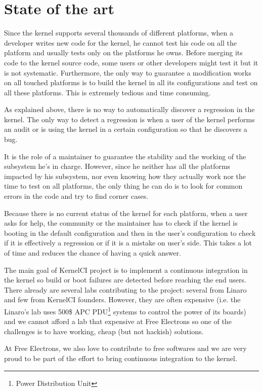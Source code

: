 \section{State of the art}
Since the kernel supports several thousands of different platforms, when a developer writes new code for the kernel, he cannot test his code on all the platform and usually tests only on the platforms he owns. Before merging its code to the kernel source code, some users or other developers might test it but it is not systematic. Furthermore, the only way to guarantee a modification works on all touched platforms is to build the kernel in all its configurations and test on all these platforms. This is extremely tedious and time consuming.

As explained above, there is no way to automatically discover a regression in the kernel. The only way to detect a regression is when a user of the kernel performs an audit or is using the kernel in a certain configuration so that he discovers a bug.

It is the role of a maintainer to guarantee the stability and the working of the subsystem he's in charge. However, since he neither has all the platforms impacted by his subsystem, nor even knowing how they actually work nor the time to test on all platforms, the only thing he can do is to look for common errors in the code and try to find corner cases.

Because there is no current status of the kernel for each platform, when a user asks for help, the community or the maintainer has to check if the kernel is booting in the default configuration and then in the user's configuration to check if it is effectively a regression or if it is a mistake on user's side. This takes a lot of time and reduces the chance of having a quick answer.

The main goal of KernelCI project is to implement a continuous integration in the kernel so build or boot failures are detected before reaching the end users. There already are several labs contributing to the project: several from Linaro and few from KernelCI founders. However, they are often expensive (i.e. the Linaro's lab uses 500\$ APC PDU\footnote{Power Distribution Unit} systems to control the power of its boards) and we cannot afford a lab that expensive at Free Electrons so one of the challenges is to have working, cheap (but not hackish) solutions.

At Free Electrons, we also love to contribute to free softwares and we are very proud to be part of the effort to bring continuous integration to the kernel.

